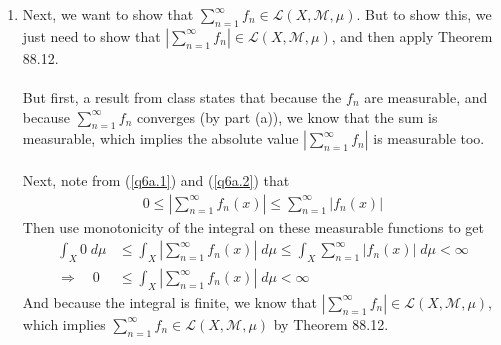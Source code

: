 \documentclass[12pt]{article}
\theoremstyle{plain}
\theoremstyle{definition}
\theoremstyle{remark}
\begin{document}
\begin{enumerate}
\begin{enumerate}
\item Next, we want to show that $\sum^\infty_{n=1} f_n\in \mathscr{L}(X,\mathscr{M},\mu)$. But to show this, we just need to show that $\left\lvert\sum^\infty_{n=1}f_n\right\rvert\in\mathscr{L}(X,\mathscr{M},\mu)$, and then apply Theorem 88.12.
\\
\\
But first, a result from class states that because the $f_n$ are measurable, and because $\sum^\infty_{n=1} f_n$ converges (by part (a)), we know that the sum is measurable, which implies the absolute value $\left\lvert\sum^\infty_{n=1}f_n\right\rvert$ is measurable too. 
\\
\\
Next, note from (\ref{q6a.1}) and (\ref{q6a.2}) that 
\begin{align*}
    0\leq 
    \left\lvert \sum^\infty_{n=1} f_n(x)\right\rvert \leq
    \sum^\infty_{n=1} \left\lvert 
        f_n(x)\right\rvert 
\end{align*}
Then use monotonicity of the integral on these measurable functions to get
\begin{align*}
    \int_X 0\;d\mu &\leq 
    \int_X 
    \left\lvert \sum^\infty_{n=1} f_n(x)\right\rvert 
    \; d\mu
    \leq
    \int_X\sum^\infty_{n=1} \left\lvert 
        f_n(x)\right\rvert \;d\mu < \infty \\
    \Rightarrow \quad
    0 &\leq
    \int_X 
    \left\lvert \sum^\infty_{n=1} f_n(x)\right\rvert 
    \; d\mu <\infty
\end{align*}
And because the integral is finite, we know that $\left\lvert \sum^\infty_{n=1} f_n \right\rvert\in\mathscr{L}(X,\mathscr{M},\mu)$, which implies $\sum^\infty_{n=1} f_n \in\mathscr{L}(X,\mathscr{M},\mu)$ by Theorem 88.12.


\end{enumerate}
\end{enumerate}
\end{document}
